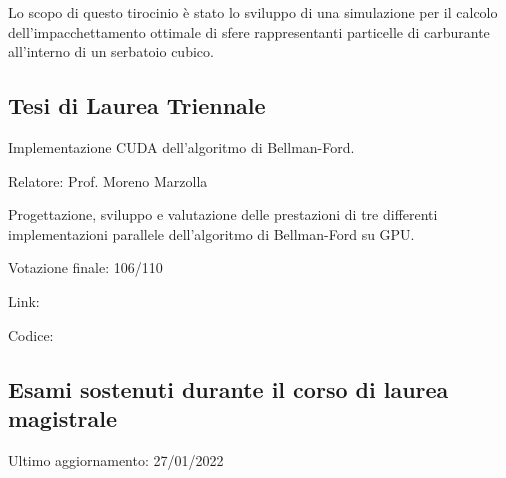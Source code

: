 \documentclass[curriculum-vitae]{subfiles}
\begin{document}
			Lo scopo di questo tirocinio è stato lo sviluppo di una simulazione per il calcolo dell'impacchettamento ottimale di sfere rappresentanti particelle di carburante all'interno di un serbatoio cubico.
		
		\subsection*{Tesi di Laurea Triennale}
			Implementazione CUDA dell'algoritmo di Bellman-Ford.
			
			Relatore: Prof. Moreno Marzolla
			
			Progettazione, sviluppo e valutazione delle prestazioni di tre differenti implementazioni parallele dell'algoritmo di Bellman-Ford su GPU.
			
			Votazione finale: 106/110
			
			Link: 
			
			Codice: 
		
		\subsection*{Esami sostenuti durante il corso di laurea magistrale}
			{\small Ultimo aggiornamento: 27/01/2022}
			\medskip
			
			\begin{minipage}[t]{.47\textwidth}
			\end{minipage}
			\hfill
			\begin{minipage}[t]{.47\textwidth}
			\end{minipage}
\end{document}
